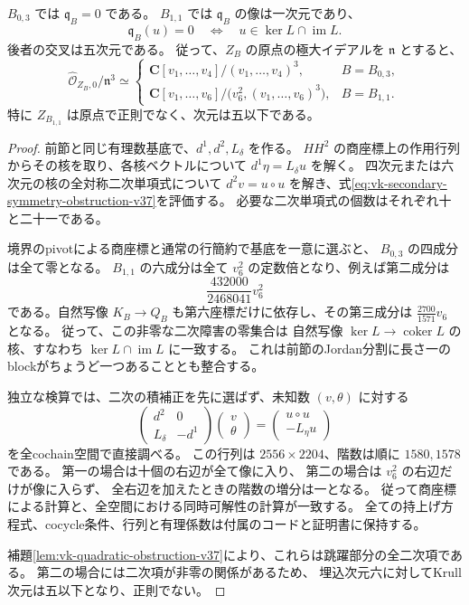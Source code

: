 \begin{theorem}[外的導分を保つ部分の二次近傍]
\label{thm:vk-symmetry-second-neighborhood-v37}
$B_{0,3}$ では $\mathfrak q_B=0$ である。
$B_{1,1}$ では $\mathfrak q_B$ の像は一次元であり、
\[
 \mathfrak q_B(u)=0
 \quad\Longleftrightarrow\quad
 u\in\ker L\cap\operatorname{im}L.
\]
後者の交叉は五次元である。
従って、$Z_B$ の原点の極大イデアルを $\mathfrak n$ とすると、
\[
 \widehat{\mathcal O}_{Z_B,0}/\mathfrak n^3\simeq
 \begin{cases}
 \mathbf C[v_1,\ldots,v_4]/(v_1,\ldots,v_4)^3,&B=B_{0,3},\\[2pt]
 \mathbf C[v_1,\ldots,v_6]/\bigl(v_6^2,(v_1,\ldots,v_6)^3\bigr),&B=B_{1,1}.
 \end{cases}
\]
特に $Z_{B_{1,1}}$ は原点で正則でなく、次元は五以下である。
\end{theorem}

\begin{proof}
前節と同じ有理数基底で、$d^1,d^2,L_\delta$ を作る。
$HH^2$ の商座標上の作用行列からその核を取り、各核ベクトルについて
$d^1\eta=L_\delta u$ を解く。
四次元または六次元の核の全対称二次単項式について
$d^2v=u\circ u$ を解き、式\eqref{eq:vk-secondary-symmetry-obstruction-v37}を評価する。
必要な二次単項式の個数はそれぞれ十と二十一である。

境界のpivotによる商座標と通常の行簡約で基底を一意に選ぶと、
$B_{0,3}$ の四成分は全て零となる。
$B_{1,1}$ の六成分は全て $v_6^2$ の定数倍となり、例えば第二成分は
\[
 \frac{432000}{2468041}v_6^2
\]
である。自然写像 $K_B\to Q_B$ も第六座標だけに依存し、その第三成分は
$\frac{2700}{1571}v_6$ となる。
従って、この非零な二次障害の零集合は
自然写像 $\ker L\to\operatorname{coker}L$ の核、すなわち
$\ker L\cap\operatorname{im}L$ に一致する。
これは前節のJordan分割に長さ一のblockがちょうど一つあることとも整合する。

独立な検算では、二次の積補正を先に選ばず、未知数 $(v,\theta)$ に対する
\[
 \begin{pmatrix}d^2&0\\L_\delta&-d^1\end{pmatrix}
 \begin{pmatrix}v\\\theta\end{pmatrix}
 =\begin{pmatrix}u\circ u\\-L_\eta u\end{pmatrix}
\]
を全cochain空間で直接調べる。
この行列は $2556\times2204$、階数は順に $1580,1578$ である。
第一の場合は十個の右辺が全て像に入り、
第二の場合は $v_6^2$ の右辺だけが像に入らず、
全右辺を加えたときの階数の増分は一となる。
従って商座標による計算と、全空間における同時可解性の計算が一致する。
全ての持上げ方程式、cocycle条件、行列と有理係数は付属のコードと証明書に保持する。

補題\ref{lem:vk-quadratic-obstruction-v37}により、これらは跳躍部分の全二次項である。
第二の場合には二次項が非零の関係があるため、
埋込次元六に対してKrull次元は五以下となり、正則でない。
\end{proof}

